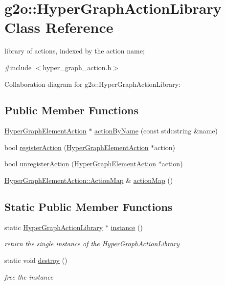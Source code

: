 \hypertarget{classg2o_1_1HyperGraphActionLibrary}{}\section{g2o\+:\+:Hyper\+Graph\+Action\+Library Class Reference}
\label{classg2o_1_1HyperGraphActionLibrary}


library of actions, indexed by the action name;  




{\ttfamily \#include $<$hyper\+\_\+graph\+\_\+action.\+h$>$}



Collaboration diagram for g2o\+:\+:Hyper\+Graph\+Action\+Library\+:
\subsection*{Public Member Functions}
\begin{DoxyCompactItemize}
\item 
\hyperlink{classg2o_1_1HyperGraphElementAction}{Hyper\+Graph\+Element\+Action} $\ast$ \hyperlink{classg2o_1_1HyperGraphActionLibrary_abef8ce416dd53f2d4e8d8566abf4a00f}{action\+By\+Name} (const std\+::string \&name)
\item 
bool \hyperlink{classg2o_1_1HyperGraphActionLibrary_a8ff09559af9efdf636ad14a011ef73ae}{register\+Action} (\hyperlink{classg2o_1_1HyperGraphElementAction}{Hyper\+Graph\+Element\+Action} $\ast$action)
\item 
bool \hyperlink{classg2o_1_1HyperGraphActionLibrary_abe4c076e6734ffa79f6d2bff07f9fad5}{unregister\+Action} (\hyperlink{classg2o_1_1HyperGraphElementAction}{Hyper\+Graph\+Element\+Action} $\ast$action)
\item 
\hyperlink{classg2o_1_1HyperGraphElementAction_abc889fc90ae1bbb63d90c7993777417a}{Hyper\+Graph\+Element\+Action\+::\+Action\+Map} \& \hyperlink{classg2o_1_1HyperGraphActionLibrary_a99d123d19dda08f30ab0088d361fc640}{action\+Map} ()
\end{DoxyCompactItemize}
\subsection*{Static Public Member Functions}
\begin{DoxyCompactItemize}
\item 
static \hyperlink{classg2o_1_1HyperGraphActionLibrary}{Hyper\+Graph\+Action\+Library} $\ast$ \hyperlink{classg2o_1_1HyperGraphActionLibrary_a12074e3f4d9bcb3da20a4fe23d18b745}{instance} ()
\begin{DoxyCompactList}\small\item\em return the single instance of the \hyperlink{classg2o_1_1HyperGraphActionLibrary}{Hyper\+Graph\+Action\+Library} \end{DoxyCompactList}\item 
static void \hyperlink{classg2o_1_1HyperGraphActionLibrary_aa235ae7c242c522518b07d019dbf8a51}{destroy} ()
\begin{DoxyCompactList}\small\item\em free the instance \end{DoxyCompactList}\end{DoxyCompactItemize}
